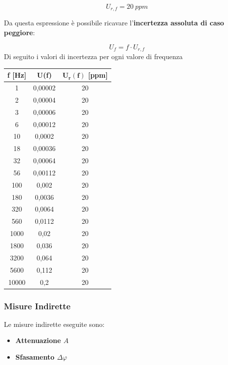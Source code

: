 \[U_{r,f} = 20 \ ppm\]

Da questa espressione è possibile ricavare l'\textbf{incertezza assoluta di caso peggiore}:

\[U_f = f \cdot U_{r,f}\]
Di seguito i valori di incertezza per ogni valore di frequenza 

\begin{table}[!ht]
    \centering
    \begin{tabular}{|c|c|c|}
    \hline

        \textbf{f [Hz]} & \textbf{U(f)} & $\bm{U_r(f)}$ [ppm] \\ \hline

        1 & 0,00002 & 20 \\ \hline
        2 & 0,00004 & 20 \\ \hline
        3 & 0,00006 & 20 \\ \hline
        6 & 0,00012 & 20 \\ \hline
        10 & 0,0002 & 20 \\ \hline
        18 & 0,00036 & 20 \\ \hline
        32 & 0,00064 & 20 \\ \hline
        56 & 0,00112 & 20 \\ \hline
        100 & 0,002 & 20 \\ \hline
        180 & 0,0036 & 20 \\ \hline
        320 & 0,0064 & 20 \\ \hline
        560 & 0,0112 & 20 \\ \hline
        1000 & 0,02 & 20 \\ \hline
        1800 & 0,036 & 20 \\ \hline
        3200 & 0,064 & 20 \\ \hline
        5600 & 0,112 & 20 \\ \hline
        10000 & 0,2 & 20 \\ \hline
    \end{tabular}
\end{table}

\FloatBarrier
\clearpage


\subsubsection{Misure Indirette}

Le misure indirette eseguite sono:
\begin{itemize}
    \item \textbf{Attenuazione $A$}
    \item \textbf{Sfasamento $\Delta \varphi$}
\end{itemize}


